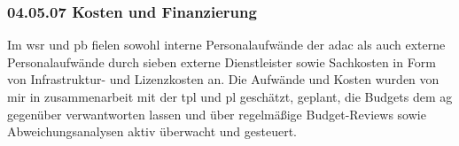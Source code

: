 \subsubsection*{04.05.07 Kosten und Finanzierung} 
\label{sec:04.05.07.KostenUndFinanzierung}

\par Im \gls{wsr} und \gls{pb} fielen sowohl interne Personalaufwände der \gls{adac} als auch externe Personalaufwände durch sieben externe Dienstleister sowie Sachkosten in Form von Infrastruktur- und Lizenzkosten an. Die Aufwände und Kosten wurden von mir in zusammenarbeit mit der \gls{tpl} und \gls{pl} geschätzt, geplant, die Budgets dem \gls{ag} gegenüber verwantworten lassen und über regelmäßige Budget-Reviews sowie Abweichungsanalysen aktiv überwacht und gesteuert.